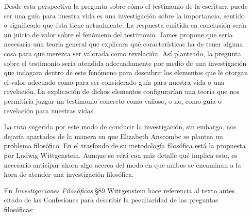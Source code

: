 
  Desde esta perspectiva la pregunta sobre cómo el testimonio de la escritura
  puede ser una guía para nuestra vida es una investigación sobre la importancia,
  sentido o significado que ésta tiene actualmente. La respuesta emitida en
  conclusión sería un juicio de valor sobre el fenómeno del testimonio. James
  propone que sería necesaria una teoría general que explicara qué características
  ha de tener alguna cosa para que merezca ser valorada como revelación. Así
  planteado, la pregunta sobre el testimonio sería atendida adecuadamente por
  medio de una investigación que indagara dentro de este fenómeno para descubrir
  los elementos que le otorgan el valor adecuado como para ser considerado guía
  para nuestra vida o una revelación. La explicación de dichos elementos
  configurarían una teoría que nos permitiría juzgar un testimonio concreto como
  valioso, o no, como guía o revelación para nuestras vidas.

  La ruta sugerida por este modo de conducir la investigación, sin embargo, nos
  dejaría apartados de la manera en que Elizabeth Anscombe se plantea un problema
  filosófico. En el trasfondo de su metodología filosófica está la propuesta por
  Ludwig Wittgenstein. Aunque se verá con más detalle qué implica esto, es
  necesario anticipar ahora algo acerca del modo en que ambos se encaminan a la
  hora de atender una investigación filosófica.

  En \emph{Investigaciones Filosóficas} \S89 Wittgenstein hace referencia al
  texto antes citado de las Confesiones para describir la peculiaridad de las
  preguntas filosóficas:

